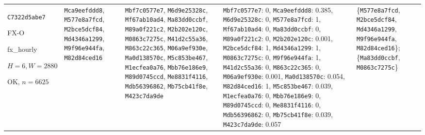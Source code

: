 \begin{longtable}{p{.15\linewidth}p{.17\linewidth}p{.17\linewidth}p{.25\linewidth}p{.14\linewidth}}
\texttt{C7322d5abe7}\par FX-O\par fx\_\allowbreak{}hourly\par $H=6,W=2880$\par OK, $n=6625$ & \texttt{Mca9eefddd8}, \texttt{M577e8a7fcd}, \texttt{M2bce5dcf84}, \texttt{Md4346a1299}, \texttt{M9f96e944fa}, \texttt{M82d84ced16} & \texttt{Mbf7c0577e7}, \texttt{M6d9e25328c}, \texttt{Mf67ab10ad4}, \texttt{Ma83dd0ccbf}, \texttt{M89a0f221c2}, \texttt{M2b202e120c}, \texttt{M0863c7275c}, \texttt{M41d2c55a36}, \texttt{M863c22c365}, \texttt{M06a9ef930e}, \texttt{Ma0d138570c}, \texttt{M5c853be467}, \texttt{M1ecfea0a76}, \texttt{Mbb76e186e9}, \texttt{M89d0745ccd}, \texttt{Me8831f4116}, \texttt{Mdb56396862}, \texttt{Mb75cb41f8e}, \texttt{M423c7da9de} & \texttt{Mbf7c0577e7}: 0, \texttt{Mca9eefddd8}: 0.385, \texttt{M6d9e25328c}: 0, \texttt{M577e8a7fcd}: 1, \texttt{Mf67ab10ad4}: 0, \texttt{Ma83dd0ccbf}: 0, \texttt{M89a0f221c2}: 0, \texttt{M2b202e120c}: 0.001, \texttt{M2bce5dcf84}: 1, \texttt{Md4346a1299}: 1, \texttt{M0863c7275c}: 0, \texttt{M9f96e944fa}: 1, \texttt{M41d2c55a36}: 0, \texttt{M863c22c365}: 0, \texttt{M06a9ef930e}: 0.001, \texttt{Ma0d138570c}: 0.054, \texttt{M82d84ced16}: 1, \texttt{M5c853be467}: 0.039, \texttt{M1ecfea0a76}: 0, \texttt{Mbb76e186e9}: 0, \texttt{M89d0745ccd}: 0, \texttt{Me8831f4116}: 0, \texttt{Mdb56396862}: 0, \texttt{Mb75cb41f8e}: 0.039, \texttt{M423c7da9de}: 0.057 & \{\texttt{M577e8a7fcd}, \texttt{M2bce5dcf84}, \texttt{Md4346a1299}, \texttt{M9f96e944fa}, \texttt{M82d84ced16}\}; \{\texttt{Ma83dd0ccbf}, \texttt{M0863c7275c}\} \\

\end{longtable}
